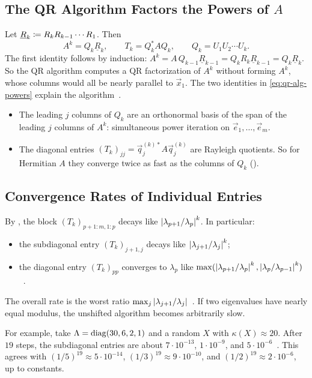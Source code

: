 \subsection{The QR Algorithm Factors the Powers of $A$}

Let $\underline{R}_k \coloneqq R_kR_{k-1}\cdots R_1$. Then
\begin{equation}
  A^k = Q_k\underline{R}_k, \qquad T_k = Q_k^\ast AQ_k, \qquad Q_k = U_1U_2\cdots U_k.
  \label{eq:qr-alg-powers}
\end{equation}
The first identity follows by induction: $A^k = A\,Q_{k-1}\underline{R}_{k-1} = Q_kR_k\underline{R}_{k-1} = Q_k\underline{R}_k$. So the QR algorithm computes a QR factorization of $A^k$ without forming $A^k$, whose columns would all be nearly parallel to $\vec{x}_1$. The two identities in \cref{eq:qr-alg-powers} explain the algorithm~\cite[Lecture~28]{TB}.
\begin{itemize}
  \item The leading $j$ columns of $Q_k$ are an orthonormal basis of the span of the leading $j$ columns of $A^k$: simultaneous power iteration on $\vec{e}_1, \dots, \vec{e}_m$.
  \item The diagonal entries $(T_k)_{jj} = \vec{q}_j^{(k)\ast}A\vec{q}_j^{(k)}$ are Rayleigh quotients. So for Hermitian $A$ they converge twice as fast as the columns of $Q_k$ ().
\end{itemize}

\subsection{Convergence Rates of Individual Entries}

By , the block $(T_k)_{p+1:m,1:p}$ decays like $\left\lvert \lambda_{p+1}/\lambda_p \right\rvert^k$. In particular:
\begin{itemize}
  \item the subdiagonal entry $(T_k)_{j+1,j}$ decays like $\left\lvert \lambda_{j+1}/\lambda_j \right\rvert^k$;
  \item the diagonal entry $(T_k)_{pp}$ converges to $\lambda_p$ like $\max(\left\lvert \lambda_{p+1}/\lambda_p \right\rvert^k, \left\lvert \lambda_p/\lambda_{p-1} \right\rvert^k)$~\cite[\S4.4.3]{Demmel}.
\end{itemize}
The overall rate is the worst ratio $\max_j\left\lvert \lambda_{j+1}/\lambda_j \right\rvert$~\cite[Thm.~28.4]{TB}. If two eigenvalues have nearly equal modulus, the unshifted algorithm becomes arbitrarily slow.

For example, take $\Lambda = \operatorname{diag}(30, 6, 2, 1)$ and a random $X$ with $\kappa(X) \approx 20$. After $19$ steps, the subdiagonal entries are about $7 \cdot 10^{-13}$, $1 \cdot 10^{-9}$, and $5 \cdot 10^{-6}$~\cite[Example~4.5]{Demmel}. This agrees with $(1/5)^{19} \approx 5 \cdot 10^{-14}$, $(1/3)^{19} \approx 9 \cdot 10^{-10}$, and $(1/2)^{19} \approx 2 \cdot 10^{-6}$, up to constants.

